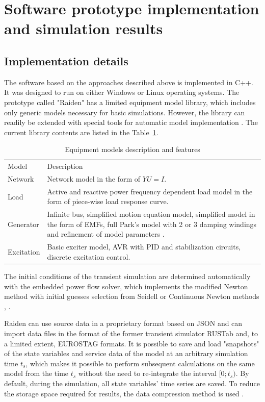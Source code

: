 \documentclass[lettersize,journal]{IEEEtran}
\begin{document}
\section {Software prototype implementation and simulation results}
\subsection {Implementation details}

The software based on the approaches described above is implemented in C++. It was designed to run on either Windows or Linux operating systems. The prototype called "Raiden" has a limited equipment model library, which includes only generic models necessary for basic simulations. However, the library can readily be extended with special tools for automatic model implementation \cite{mycompiler}. The current library contents are listed in the Table~\ref{tab:models}.

\begin{table}[!h]
	\caption{Equipment models description and features \label{tab:models}}
	\centering
	\setlength\extrarowheight{1pt}
	\begin{tabularx}{\columnwidth}{|l|X|}
		\hline
		Model & Description \\
		\hlineB{3}	
		Network & Network model in the form of \(YU=I\).  \\
		\hline
		Load & Active and reactive power frequency dependent load model in the form of piece-wise load response curve.\\
		\hline
		Generator & Infinite bus, simplified motion equation model, simplified model in the form of EMFs, full Park's model with 2 or 3 damping windings and refinement of model parameters \cite{Canay93}. \\
		\hline
		Excitation & Basic exciter model, AVR with PID and stabilization circuits, discrete excitation control.\\
		\hline
	\end{tabularx}
\end{table}

The initial conditions of the transient simulation are determined automatically with the embedded power flow solver, which implements the modified Newton method with initial guesses selection from Seidell or Continuous Newton methods \cite{MilanoRK09}, \cite{TostadoVliz2021}.

Raiden can use source data in a proprietary format based on JSON and can import data files in the format of the former transient simulator RUSTab and, to a limited extent, EUROSTAG formats. It is possible to save and load "snapshots" of the state variables and service data of the model at an arbitrary simulation time \(t_s\), which makes it possible to perform subsequent calculations on the same model from the time \(t_s\) without the need to re-integrate the interval \([0;t_s)\). By default, during the simulation, all state variables' time series are saved. To reduce the storage space required for results, the data compression method is used \cite{mycompression}.
\end{document}
